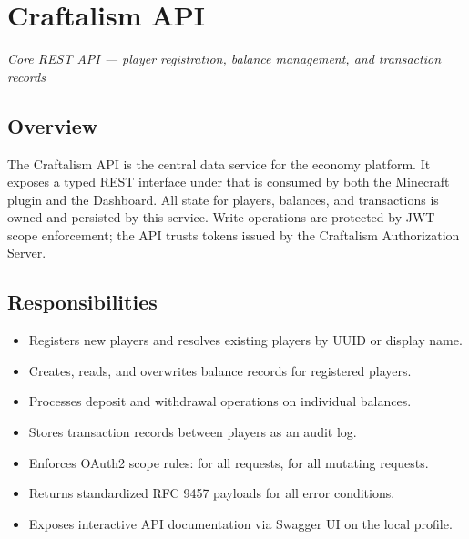 

\chapter{Craftalism API}
\label{ch:api}


\textcolor{CraftGray}{\textit{Core REST API — player registration, balance management, and transaction records}}

\bigskip

\section{Overview}

The Craftalism API is the central data service for the economy platform. It exposes a typed REST interface under  that is consumed by both the Minecraft plugin and the Dashboard. All state for players, balances, and transactions is owned and persisted by this service. Write operations are protected by JWT scope enforcement; the API trusts tokens issued by the Craftalism Authorization Server.

\section{Responsibilities}

\begin{itemize}
  \item Registers new players and resolves existing players by UUID or display name.
  \item Creates, reads, and overwrites balance records for registered players.
  \item Processes deposit and withdrawal operations on individual balances.
  \item Stores transaction records between players as an audit log.
  \item Enforces OAuth2 scope rules:  for all  requests,  for all mutating requests.
  \item Returns standardized RFC 9457  payloads for all error conditions.
  \item Exposes interactive API documentation via Swagger UI on the local profile.
\end{itemize}

